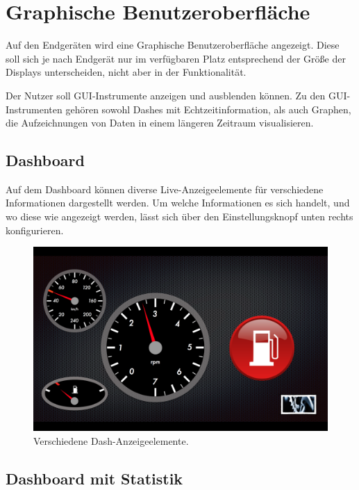 \documentclass[pflichtenheft.tex]{subfiles}
\begin{document}
\chapter{Graphische Benutzeroberfläche}
Auf den Endgeräten wird eine Graphische Benutzeroberfläche angezeigt. Diese soll sich je nach Endgerät nur im verfügbaren Platz entsprechend der Größe der Displays unterscheiden, nicht aber in der Funktionalität.

Der Nutzer soll GUI-Instrumente anzeigen und ausblenden können. Zu den GUI-Instrumenten gehören sowohl Dashes mit Echtzeitinformation, als auch Graphen, die Aufzeichnungen von Daten in einem längeren Zeitraum visualisieren.


\section{Dashboard}

Auf dem Dashboard können diverse Live-Anzeigeelemente für verschiedene Informationen dargestellt werden. Um welche Informationen es sich handelt, und wo diese wie angezeigt werden, lässt sich über den Einstellungsknopf unten rechts konfigurieren.

\begin{figure}[H]
  	\begin{center}
 		\includegraphics[width=\textwidth]{Images/GUI-Dash.png}
  		\caption{Verschiedene Dash-Anzeigeelemente.}
  	\end{center}
\end{figure}


\section{Dashboard mit Statistik}
\end{document}
